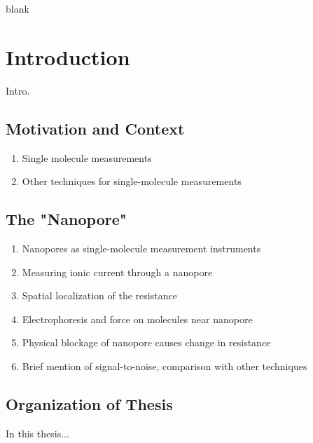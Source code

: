 \begin{savequote}[75mm]
blank
\end{savequote}

\chapter{Introduction}
\label{introduction}

Intro.

\section{Motivation and Context}

\begin{enumerate}
\item Single molecule measurements
\item Other techniques for single-molecule measurements
\end{enumerate}

\section{The "Nanopore"}

\begin{enumerate}
\item Nanopores as single-molecule measurement instruments
\item Measuring ionic current through a nanopore
\item Spatial localization of the resistance
\item Electrophoresis and force on molecules near nanopore
\item Physical blockage of nanopore causes change in resistance
\item Brief mention of signal-to-noise, comparison with other techniques
\end{enumerate}

\section{Organization of Thesis}

In this thesis... \cite{Bryant1994} \cite{Vercoutere2001}
